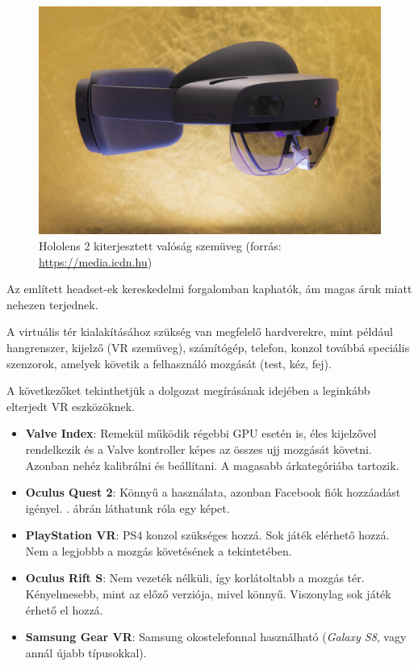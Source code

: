
\begin{figure}[htp]
    \centering
   	\includegraphics[scale=0.1]{images/holo.jpg}
	\caption{Hololens 2 kiterjesztett valóság szemüveg (forrás: \url{https://media.icdn.hu})}
	\label{fig:hololens}
\end{figure}

Az említett headset-ek kereskedelmi forgalomban kaphatók, ám magas áruk miatt nehezen terjednek. 


A virtuális tér kialakításához szükség van megfelelő hardverekre, mint például hangrenszer, kijelző (VR szemüveg), számítógép, telefon, konzol továbbá speciális szenzorok, amelyek követik a felhasználó mozgását (test, kéz, fej).

A következőket tekinthetjük a dolgozat megírásának idejében a leginkább elterjedt VR eszközöknek.
\begin{itemize}
\item {\bf Valve Index}: Remekül működik régebbi GPU esetén is, éles kijelzővel rendelkezik és a Valve kontroller képes az összes ujj mozgását követni. Azonban nehéz kalibrálni és beállítani. A magasabb árkategóriába tartozik.
\item {\bf Oculus Quest 2}: Könnyű a használata, azonban Facebook fiók hozzáadást igényel. . ábrán láthatunk róla egy képet.
\item {\bf PlayStation VR}: PS4 konzol szükséges hozzá. Sok játék elérhető hozzá. Nem a legjobbb a mozgás követésének a tekintetében.
\item {\bf Oculus Rift S}: Nem vezeték nélküli, így korlátoltabb a mozgás tér.  Kényelmesebb, mint az előző verziója, mivel könnyű. Viszonylag sok játék érhető el hozzá.
\item {\bf Samsung Gear VR}: Samsung okostelefonnal használható (\textit{Galaxy S8}, vagy annál újabb típusokkal).
\end{itemize}

